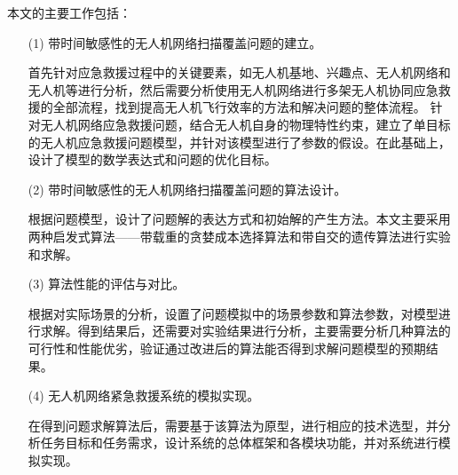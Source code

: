 本文的主要工作包括：
\begin{itemize}
  \item [(1)] 
  带时间敏感性的无人机网络扫描覆盖问题的建立。


  \qquad 首先针对应急救援过程中的关键要素，如无人机基地、兴趣点、无人机网络和无人机等进行分析，然后需要分析使用无人机网络进行多架无人机协同应急救援的全部流程，找到提高无人机飞行效率的方法和解决问题的整体流程。
  针对无人机网络应急救援问题，结合无人机自身的物理特性约束，建立了单目标的无人机应急救援问题模型，并针对该模型进行了参数的假设。在此基础上，设计了模型的数学表达式和问题的优化目标。
  \item [(2)]
  带时间敏感性的无人机网络扫描覆盖问题的算法设计。


  \qquad 根据问题模型，设计了问题解的表达方式和初始解的产生方法。本文主要采用两种启发式算法——带载重的贪婪成本选择算法和带自交的遗传算法进行实验和求解。
  \item [(3)]
  算法性能的评估与对比。


  \qquad 根据对实际场景的分析，设置了问题模拟中的场景参数和算法参数，对模型进行求解。得到结果后，还需要对实验结果进行分析，主要需要分析几种算法的可行性和性能优劣，验证通过改进后的算法能否得到求解问题模型的预期结果。
  \item [(4)]
  无人机网络紧急救援系统的模拟实现。


  \qquad 在得到问题求解算法后，需要基于该算法为原型，进行相应的技术选型，并分析任务目标和任务需求，设计系统的总体框架和各模块功能，并对系统进行模拟实现。
\end{itemize}